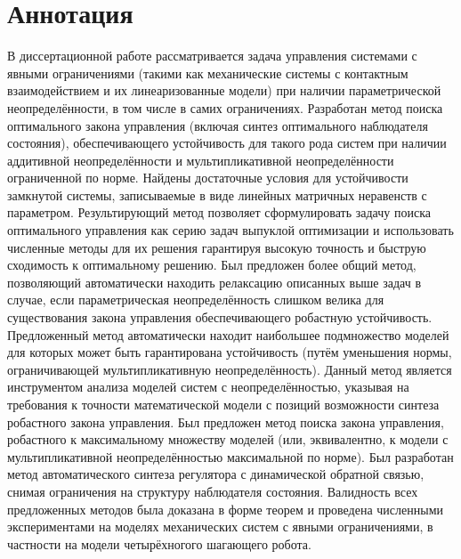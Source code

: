 \chapter*{Аннотация}                         %

В диссертационной работе рассматривается задача управления системами с явными ограничениями (такими как механические системы с контактным взаимодействием и их линеаризованные модели) при наличии параметрической неопределённости, в том числе в самих ограничениях. Разработан метод поиска оптимального закона управления (включая синтез оптимального наблюдателя состояния), обеспечивающего устойчивость для такого рода систем при наличии аддитивной неопределённости и мультипликативной неопределённости ограниченной по норме. Найдены достаточные условия для устойчивости замкнутой системы, записываемые в виде линейных матричных неравенств с параметром. Результирующий метод позволяет сформулировать задачу поиска оптимального управления как серию задач выпуклой оптимизации и использовать численные методы для их решения гарантируя высокую точность и быструю сходимость к оптимальному решению. Был предложен более общий метод, позволяющий автоматически находить релаксацию описанных выше задач в случае, если параметрическая неопределённость слишком велика для существования закона управления обеспечивающего робастную устойчивость. Предложенный метод автоматически находит наибольшее подмножество моделей для которых может быть гарантирована устойчивость (путём уменьшения нормы, ограничивающей мультипликативную неопределённость). Данный метод является инструментом анализа моделей систем с неопределённостью, указывая на требования к точности математической модели с позиций возможности синтеза робастного закона управления. Был предложен метод поиска закона управления, робастного к максимальному множеству моделей (или, эквивалентно, к модели с мультипликативной неопределённостью максимальной по норме). Был разработан метод автоматического синтеза регулятора с динамической обратной связью, снимая ограничения на структуру наблюдателя состояния.  Валидность всех предложенных методов была доказана в форме теорем и проведена численными экспериментами на моделях механических систем с явными ограничениями, в частности на модели четырёхногого шагающего робота.